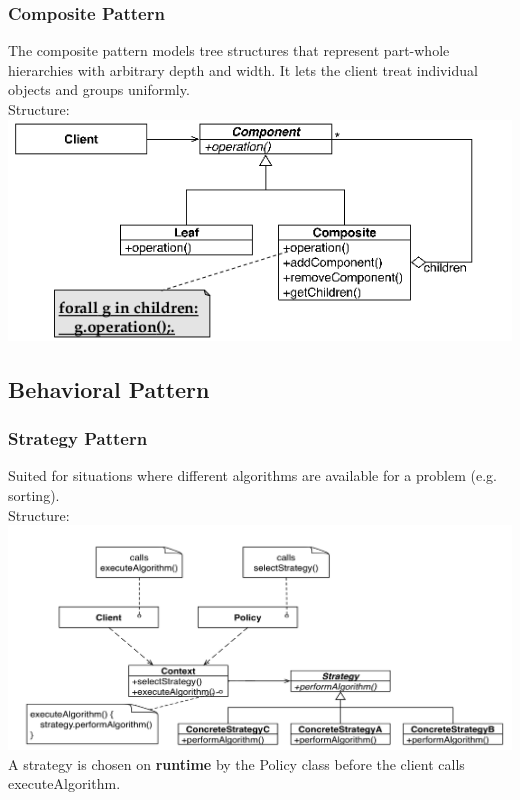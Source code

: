 \subsubsection{Composite Pattern}
The composite pattern models tree structures that represent part-whole hierarchies with arbitrary depth and width.
It lets the client treat individual objects and groups uniformly. \\
Structure:\\
\includegraphics[width=\linewidth]{design_pattern/composite.png}


\subsection{Behavioral Pattern}

\subsubsection{Strategy Pattern}
Suited for situations where different algorithms are available for a problem (e.g. sorting).\\
Structure:\\
\includegraphics[width=\linewidth]{design_pattern/strategy.png}
A strategy is chosen on \textbf{runtime} by the Policy class before the client calls executeAlgorithm.

